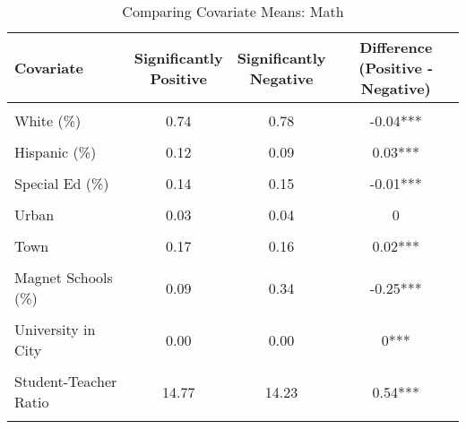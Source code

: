 \begin{table}[!h]
\centering
\caption{\label{tab:cov_means_math}Comparing Covariate Means: Math}
\centering
\begin{tabular}[t]{lccc}
\toprule
Covariate & \makecell[c]{Significantly\\Positive} & \makecell[c]{Significantly\\Negative} & \makecell[c]{Difference\\(Positive - Negative)}\\
\midrule
\cellcolor{gray!10}{Log of Enrollment} & \cellcolor{gray!10}{7.29} & \cellcolor{gray!10}{7.26} & \cellcolor{gray!10}{0.03}\\
White (\%) & 0.74 & 0.78 & -0.04***\\
\cellcolor{gray!10}{Black (\%)} & \cellcolor{gray!10}{0.07} & \cellcolor{gray!10}{0.06} & \cellcolor{gray!10}{0**}\\
Hispanic (\%) & 0.12 & 0.09 & 0.03***\\
\cellcolor{gray!10}{Free/Reduced Lunch (\%)} & \cellcolor{gray!10}{0.45} & \cellcolor{gray!10}{0.42} & \cellcolor{gray!10}{0.04***}\\
Special Ed (\%) & 0.14 & 0.15 & -0.01***\\
\cellcolor{gray!10}{Baseline Performance} & \cellcolor{gray!10}{0.28} & \cellcolor{gray!10}{0.40} & \cellcolor{gray!10}{-0.12***}\\
Urban & 0.03 & 0.04 & 0\\
\cellcolor{gray!10}{Suburb} & \cellcolor{gray!10}{0.29} & \cellcolor{gray!10}{0.31} & \cellcolor{gray!10}{-0.02*}\\
Town & 0.17 & 0.16 & 0.02***\\
\cellcolor{gray!10}{Rural} & \cellcolor{gray!10}{0.50} & \cellcolor{gray!10}{0.50} & \cellcolor{gray!10}{0}\\
Magnet Schools (\%) & 0.09 & 0.34 & -0.25***\\
\cellcolor{gray!10}{City Population (standardized)} & \cellcolor{gray!10}{0.00} & \cellcolor{gray!10}{0.00} & \cellcolor{gray!10}{0}\\
University in City & 0.00 & 0.00 & 0***\\
\cellcolor{gray!10}{Per Pupil Revenue} & \cellcolor{gray!10}{13857.58} & \cellcolor{gray!10}{14541.93} & \cellcolor{gray!10}{-684.35***}\\
Student-Teacher Ratio & 14.77 & 14.23 & 0.54***\\
\cellcolor{gray!10}{Teacher Salary} & \cellcolor{gray!10}{95478.39} & \cellcolor{gray!10}{96551.46} & \cellcolor{gray!10}{-1073.08***}\\

\end{tabular}
\end{table}

